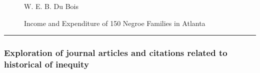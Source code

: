 \documentclass[
  letterpaper,
  DIV=11,
  numbers=noendperiod]{scrartcl}
\begin{document}
\begin{figure}

\begin{minipage}[t]{0.50\linewidth}

{\centering 


\caption{W. E. B. Du Bois}

}

\end{minipage}%
%
\begin{minipage}[t]{0.50\linewidth}

{\centering 


\caption{Income and Expenditure of 150 Negroe Families in Atlanta}

}

\end{minipage}%

\end{figure}

\begin{center}\rule{0.5\linewidth}{0.5pt}\end{center}

\hypertarget{exploration-of-journal-articles-and-citations-related-to-historical-of-inequity}{%
\subsubsection{Exploration of journal articles and citations related to
historical of
inequity}\label{exploration-of-journal-articles-and-citations-related-to-historical-of-inequity}}
\end{document}
